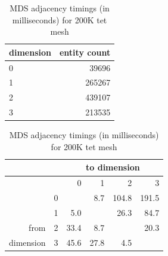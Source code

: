 \begin{table}
\caption{MDS adjacency timings (in milliseconds) for 200K tet mesh}
\label{tab:adj_200}
\begin{center}
\begin{tabular}{l|r|}
dimension & entity count \\\hline
0 & 39696  \\
1 & 265267 \\
2 & 439107 \\
3 & 213535 \\
\end{tabular}
\begin{tabular}{|r|r|r r r r}
               &   & \multicolumn{4}{c}{to dimension} \\\hline
               &   &    0 &    1 &     2 &     3 \\\hline
               & 0 &      &  8.7 & 104.8 & 191.5 \\
               & 1 &  5.0 &      &  26.3 &  84.7 \\
from           & 2 & 33.4 &  8.7 &       &  20.3 \\
dimension      & 3 & 45.6 & 27.8 &   4.5 &       \\
\end{tabular}
\end{center}
\end{table}


